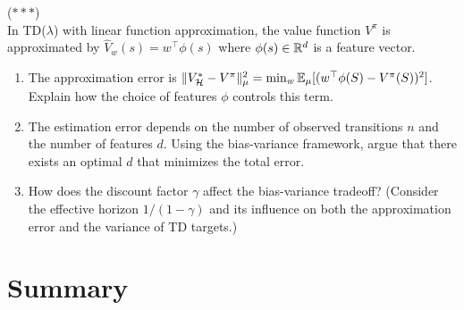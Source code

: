 \documentclass[11pt,a4paper]{article}
\begin{document}
\begin{exercise}
\textnormal{(\(\ast\ast\ast\))} \\
In TD($\lambda$) with linear function approximation, the value
function $V^\pi$ is approximated by $\hat{V}_w(s) = w^\top \phi(s)$
where $\phi(s) \in \mathbb{R}^d$ is a feature vector.
\begin{enumerate}[nosep,label=(\alph*)]
    \item The approximation error is
    $\|V_{\mathcal{H}}^* - V^\pi\|_\mu^2 = \min_w \mathbb{E}_\mu[(w^\top
    \phi(S) - V^\pi(S))^2]$.  Explain how the choice of features
    $\phi$ controls this term.
    \item The estimation error depends on the number of observed
    transitions $n$ and the number of features $d$.  Using the
    bias-variance framework, argue that there exists an optimal $d$
    that minimizes the total error.
    \item How does the discount factor $\gamma$ affect the
    bias-variance tradeoff?  (Consider the effective horizon
    $1/(1-\gamma)$ and its influence on both the approximation error
    and the variance of TD targets.)
\end{enumerate}
\end{exercise}


\section{Summary}
\label{sec:summary}
\end{document}
